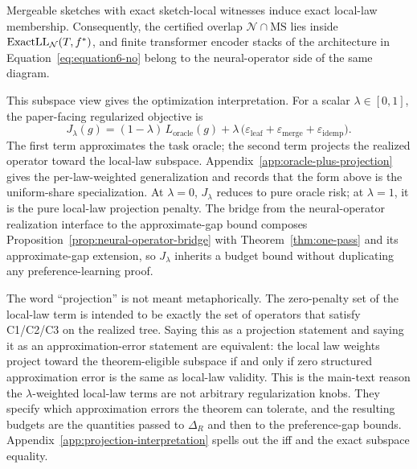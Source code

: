 \begin{proposition}\label{prop:law-constrained-no}
Mergeable sketches with exact sketch-local witnesses induce exact
local-law membership. Consequently, the certified overlap
$\mathcal{N}\cap\mathrm{MS}$ lies inside
$\mathrm{ExactLL}_{\mathcal{N}}(T,f^\ast)$, and finite transformer
encoder stacks of the architecture in Equation~\eqref{eq:equation6-no}
belong to the neural-operator side of the same diagram.
\end{proposition}

This subspace view gives the optimization interpretation. For a scalar
$\lambda\in[0,1]$, the paper-facing regularized objective is
\begin{equation}\label{eq:oracle-projection-objective}
J_\lambda(g)
  =
  (1-\lambda)\,L_{\mathrm{oracle}}(g)
  +
  \lambda\,\big(
    \varepsilon_{\mathrm{leaf}}
    + \varepsilon_{\mathrm{merge}}
    + \varepsilon_{\mathrm{idemp}}
  \big).
\end{equation}
The first term approximates the task oracle; the second term projects the
realized operator toward the local-law subspace. Appendix~\ref{app:oracle-plus-projection}
gives the per-law-weighted generalization and records that the form
above is the uniform-share specialization. At $\lambda=0$, $J_\lambda$
reduces to pure oracle risk; at $\lambda=1$, it is the pure local-law
projection penalty. The bridge from the neural-operator realization
interface to the approximate-gap bound composes
Proposition~\ref{prop:neural-operator-bridge} with
Theorem~\ref{thm:one-pass} and its approximate-gap extension, so
$J_\lambda$ inherits a budget bound without duplicating any
preference-learning proof.

The word ``projection'' is not meant metaphorically. The zero-penalty set
of the local-law term is intended to be exactly the set of operators that
satisfy C1/C2/C3 on the realized tree. Saying this as a projection statement
and saying it as an approximation-error statement are equivalent: the local
law weights project toward the theorem-eligible subspace if and only if
zero structured approximation error is the same as local-law validity. This
is the main-text reason the $\lambda$-weighted local-law terms are not
arbitrary regularization knobs. They specify which approximation errors
the theorem can tolerate, and the resulting budgets are the quantities
passed to $\Delta_R$ and then to the preference-gap bounds. Appendix~\ref{app:projection-interpretation}
spells out the iff and the exact subspace equality.


